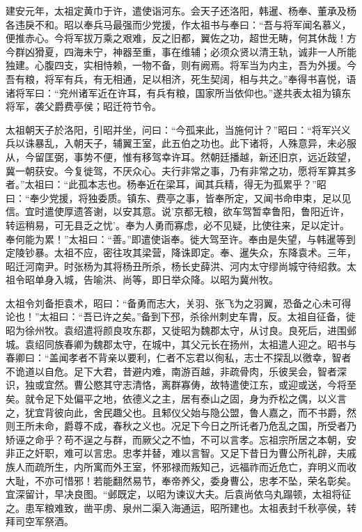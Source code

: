 \documentclass[12pt,UTF8]{ctexbook}
\begin{document}
建安元年，太祖定黄巾于许，遣使诣河东。会天子还洛阳，韩暹、杨奉、董承及杨各违戾不和。昭以奉兵马最强而少党援，作太祖书与奉曰：“吾与将军闻名慕义，便推赤心。今将军拔万乘之艰难，反之旧都，翼佐之功，超世无畴，何其休哉！方今群凶猾夏，四海未宁，神器至重，事在维辅；必须众贤以清王轨，诚非一人所能独建。心腹四支，实相恃赖，一物不备，则有阙焉。将军当为内主，吾为外援。今吾有粮，将军有兵，有无相通，足以相济，死生契阔，相与共之。”奉得书喜悦，语诸将军曰：“兖州诸军近在许耳，有兵有粮，国家所当依仰也。”遂共表太祖为镇东将军，袭父爵费亭侯；昭迁符节令。

太祖朝天子於洛阳，引昭并坐，问曰：“今孤来此，当施何计？”昭曰：“将军兴义兵以诛暴乱，入朝天子，辅翼王室，此五伯之功也。此下诸将，人殊意异，未必服从，今留匡弼，事势不便，惟有移驾幸许耳。然朝廷播越，新还旧京，远近跂望，冀一朝获安。今复徙驾，不厌众心。夫行非常之事，乃有非常之功，愿将军算其多者。”太祖曰：“此孤本志也。杨奉近在梁耳，闻其兵精，得无为孤累乎？”昭曰：“奉少党援，将独委质。镇东、费亭之事，皆奉所定，又闻书命申束，足以见信。宜时遣使厚遗答谢，以安其意。说'京都无粮，欲车驾暂幸鲁阳，鲁阳近许，转运稍易，可无县乏之忧'。奉为人勇而寡虑，必不见疑，比使往来，足以定计。奉何能为累！”太祖曰：“善。”即遣使诣奉。徙大驾至许。奉由是失望，与韩暹等到定陵钞暴。太祖不应，密往攻其梁营，降诛即定。奉、暹失众，东降袁术。三年，昭迁河南尹。时张杨为其将杨丑所杀，杨长史薛洪、河内太守缪尚城守待绍救。太祖令昭单身入城，告喻洪、尚等，即日举众降。以昭为冀州牧。

太祖令刘备拒袁术，昭曰：“备勇而志大，关羽、张飞为之羽翼，恐备之心未可得论也！”太祖曰：“吾已许之矣。”备到下邳，杀徐州刺史车胄，反。太祖自征备，徙昭为徐州牧。袁绍遣将颜良攻东郡，又徙昭为魏郡太守，从讨良。良死后，进围邺城。袁绍同族春卿为魏郡太守，在城中，其父元长在扬州，太祖遣人迎之。昭书与春卿曰：“盖闻孝者不背亲以要利，仁者不忘君以徇私，志士不探乱以徼幸，智者不诡道以自危。足下大君，昔避内难，南游百越，非疏骨肉，乐彼吴会，智者深识，独或宜然。曹公愍其守志清恪，离群寡俦，故特遣使江东，或迎或送，今将至矣。就令足下处偏平之地，依德义之主，居有泰山之固，身为乔松之偶，以义言之，犹宜背彼向此，舍民趣父也。且邾仪父始与隐公盟，鲁人嘉之，而不书爵，然则王所未命，爵尊不成，春秋之义也。况足下今日之所讬者乃危乱之国，所受者乃矫诬之命乎？苟不逞之与群，而厥父之不恤，不可以言孝。忘祖宗所居之本朝，安非正之奸职，难可以言忠。忠孝并替，难以言智。又足下昔日为曹公所礼辟，夫戚族人而疏所生，内所寓而外王室，怀邪禄而叛知己，远福祚而近危亡，弃明义而收大耻，不亦可惜邪！若能翻然易节，奉帝养父，委身曹公，忠孝不坠，荣名彰矣。宜深留计，早决良图。“邺既定，以昭为谏议大夫。后袁尚依乌丸蹋顿，太祖将征之。患军粮难致，凿平虏、泉州二渠入海通运，昭所建也。太祖表封千秋亭侯，转拜司空军祭酒。
\end{document}
